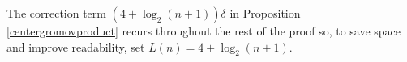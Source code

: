 \documentclass[11pt,letterpaper]{amsart}
\newtheorem{corollary}[theorem]{Corollary}
\begin{document}



The correction term $(4+\log_2(n+1))\delta$ in Proposition \ref{centergromovproduct} recurs throughout the rest of the proof so, to save space and improve readability, set $L(n)=4+\log_2(n+1)$. 
\end{document}
